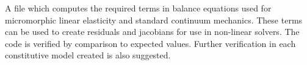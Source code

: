 A file which computes the required terms in balance equations used for micromorphic linear elasticity and standard continuum mechanics. These terms can be used to create residuals and jacobians for use in non-linear solvers. The code is verified by comparison to expected values. Further verification in each constitutive model created is also suggested.
